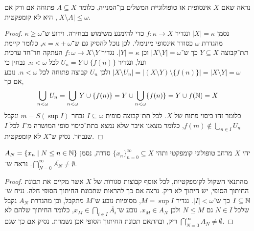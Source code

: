 \question{}
נראה שאם $X$ אינסופית אז טופולוגיית המשלים בן־המנייה,
כלומר $A \subseteq X$ פתוחה אם ורק אם $|X \setminus A| \le \omega$,
היא לא קומפקטית.
\begin{proof}
	נסמן $|X| = \kappa$ ונגדיר $f : \kappa \to X$ כדי להימנע משימוש בבחירה.
	וידוע ש־$\kappa \ge \omega$ מהגדרת $\omega$ כסודר אינסופי מינימלי.
	לכן נוכל להסיק גם ש־$\kappa = \kappa + \omega$, כלומר קיימת תת־קבוצה $Y \subseteq X$ כך ש־$|X \setminus Y| = \omega$ וכן $|Y| = \kappa$.
	נגדיר $f : \omega \to X \setminus Y$ העתקה חד־חד ערכית ועל,
	ונגדיר $U_n = Y \cup \{ f(n) \}$ לכל $n < \omega$.
	נבחין כי $|X \setminus U_n| = |(X \setminus Y) \setminus \{ f(n) \}| = |X \setminus Y| = \omega$ ולכן $U_n$ קבוצה פתוחה לכל $n < \omega$.
	נובע אם כך,
	\[
		\bigcup_{n < \omega} U_n
		= \bigcup_{n < \omega} Y \cup \{ f(n) \}
		= Y \cup \bigcup_{n < \omega} \{ f(n) \}
		= Y \cup f(\mathbb{N})
		= X
	\]
	כלומר זהו כיסוי פתוח של $X$.
	לכל תת־קבוצה סופית $I \subseteq \omega$ נבחר $m = S(\sup I)$ ונקבל $f(m) \notin \bigcup_{n \in I} U_n$, כלומר מצאנו איבר שלא נמצא בתת־כיסוי סופי המושרה מ־$I$ לכל $I$ שנבחר.
	נסיק ש־$X$ לא קומפקטית.
\end{proof}

\question{}
יהי $X$ מרחב טופולוגי קומפקטי ותהי ${\{ x_n \}}_{n = 0}^\infty \subseteq X$ סדרה,
נסמן $A_N = \{ x_n \mid N \le n \in \mathbb{N} \}$.
נראה ש־$\bigcap_{N = 0}^\infty \overline{A_N} \ne \emptyset$.
\begin{proof}
	מהתנאי השקול לקומפקטיות, לכל אוסף קבוצות סגורות של $X$ אשר מקיים את תכונת החיתוך הסופי, יש חיתוך לא ריק.
	נרצה אם כך להראות שתכונת החיתוך הסופי חלה.
	נניח ש־$I \subseteq \mathbb{N}$ כך ש־$|I| < \omega$.
	נגדיר $M = \sup I$, מסופיות נובע ש־$M$ מתקבל, וכן מהגדרת $A_N$ נקבל שלכל $N \in I$ גם $N \le M$ ולכן $x_M \in A_N$.
	נובע ש־$x_M \in \bigcap_{i \in I} \overline{A_i}$, כלומר החיתוך שלהם לא ריק, ובהתאם תכונת החיתוך הסופי אכן נשמרת.
	נסיק אם כך שגם $\bigcap_{N = 0}^\infty \overline{A_N} \ne \emptyset$.
\end{proof}

